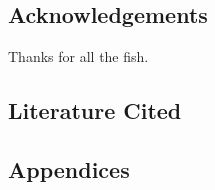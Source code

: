 \documentclass[
]{article}
\begin{document}
\hypertarget{acknowledgements}{%
\subsection{Acknowledgements}\label{acknowledgements}}

Thanks for all the fish.

\hypertarget{literature-cited}{%
\subsection{Literature Cited}\label{literature-cited}}

\hypertarget{appendices}{%
\subsection{Appendices}\label{appendices}}
\end{document}
